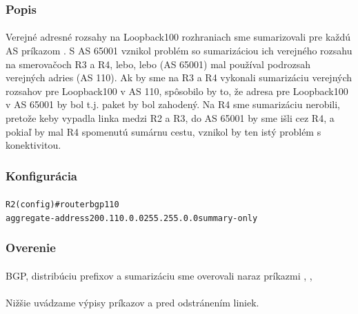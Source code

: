 \documentclass[12pt,twoside,a4paper]{report}
\begin{document}
\subsubsection{Popis}
\paragraph{}
Verejné adresné rozsahy na Loopback100 rozhraniach sme sumarizovali pre každú AS príkazom . S AS 65001 vznikol problém so sumarizáciou ich verejného rozsahu na smerovačoch R3 a R4, lebo, lebo  (AS 65001) mal používal podrozsah verejných adries  (AS 110). Ak by sme na R3 a R4 vykonali sumarizáciu verejných rozsahov pre Loopback100 v AS 110, spôsobilo by to, že  adresa pre Loopback100 v AS 65001 by bol  t.j. paket by bol zahodený. Na R4 sme sumarizáciu nerobili, pretože keby vypadla linka medzi R2 a R3, do AS 65001 by sme išli cez R4, a pokiaľ by mal R4 spomenutú sumárnu cestu, vznikol by ten istý problém s konektivitou.


\subsubsection{Konfigurácia}
\paragraph{}

\noindent
{\selectfont
\begin{small}
\begin{alltt}
R2(config)#router bgp 110
  aggregate-address 200.110.0.0 255.255.0.0 summary-only
\end{alltt}
\end{small}
}


\subsubsection{Overenie}
\paragraph{}
BGP, distribúciu prefixov a sumarizáciu sme overovali naraz príkazmi , , 

\paragraph{}
Nižšie uvádzame výpisy príkazov  a  pred odstránením liniek.
\end{document}
